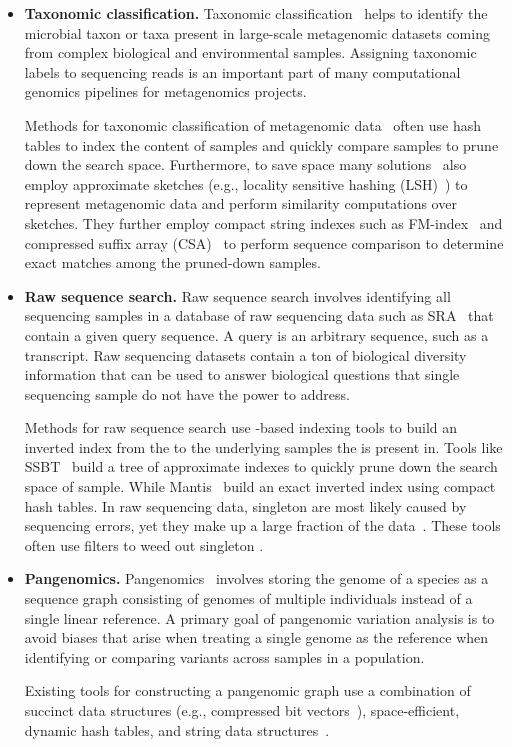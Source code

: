 \begin{itemize}[leftmargin=*]

\item {\bf Taxonomic classification.} Taxonomic classification~\cite{wood2014kraken} helps to identify the microbial taxon or taxa present in large-scale  metagenomic datasets coming from complex biological and environmental samples. Assigning taxonomic labels to sequencing reads is an important part of many computational genomics pipelines for metagenomics projects.

Methods for taxonomic classification of metagenomic data~\cite{wood2014kraken} often use hash tables to index the \kmer content of samples and quickly compare samples to prune down the search space.
Furthermore, to save space many solutions~\cite{wood2019improved} also employ approximate sketches (e.g., locality sensitive hashing (LSH)~\cite{roberts2004reducing}) to represent metagenomic data and perform similarity computations over sketches.
They further employ compact string indexes such as FM-index~\cite{ferragina2000opportunistic} and compressed suffix array (CSA)~\cite{grossi2000compressed} to perform sequence comparison to determine exact matches among the pruned-down samples.


\item {\bf Raw sequence search.} Raw sequence search involves  identifying all sequencing samples in a database of raw sequencing data such as SRA~\cite{kodama2012sequence} that contain a given query sequence. A query is an arbitrary sequence, such as a transcript. Raw sequencing datasets contain a ton of biological diversity information that can be used to answer biological questions that single sequencing sample do not have the power to address.

Methods for raw sequence search use \kmer-based indexing tools to build an inverted index from the \kmers to the underlying samples the \kmer is present in. Tools like SSBT~\cite{solomon2016fast} build a tree of approximate \kmer indexes to quickly prune down the search space of sample. While Mantis~\cite{PandeyABFJP18Cell} build an exact inverted index using compact hash tables.
In raw sequencing data, singleton \kmers are most likely caused by sequencing errors, yet they make up a large fraction of the data~\cite{solomon2016fast,MarccaisKi11}. These tools often use filters to weed out singleton \kmers.


\item {\bf Pangenomics.}
Pangenomics~\cite{garrison2018variation} involves storing the genome of a species as a sequence graph consisting of genomes of multiple individuals instead of a single linear reference. A primary goal of pangenomic variation analysis is to avoid biases that arise when treating a single genome as the reference when identifying or comparing variants across samples in a population.

Existing tools for constructing a pangenomic graph use a combination of succinct data structures (e.g., compressed bit vectors~\cite{garrison2018variation}), space-efficient, dynamic hash tables, and string data structures~\cite{pandey2021variantstore}.

\end{itemize}

